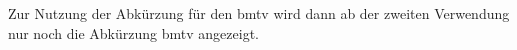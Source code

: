 \usepackage[acronym]{glossaries-extra}
\makeglossaries

Zur Nutzung der Abkürzung für den \gls{bmtv} wird dann ab der zweiten Verwendung nur noch die Abkürzung \gls{bmtv} angezeigt.

\printglossary[type=\acronymtype]
